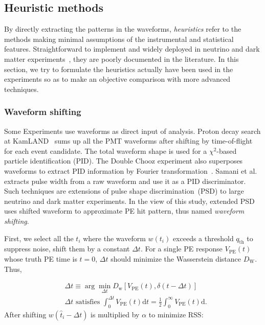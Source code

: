 \subsection{Heuristic methods}
By directly extracting the patterns in the waveforms, \textit{heuristics} refer to the methods making minimal assumptions of the instrumental and statistical features.  Straightforward to implement and widely deployed in neutrino and dark matter experiments~\cite{students22}, they are poorly documented in the literature.  In this section, we try to formulate the heuristics actually have been used in the experiments so as to make an objective comparison with more advanced techniques.

\subsubsection{Waveform shifting}
\label{sec:shifting}
Some Experiments use waveforms as direct input of analysis. Proton decay search at KamLAND~\cite{kamland_collaboration_search_2015} sums up all the PMT waveforms after shifting by time-of-flight for each event candidate.  The total waveform shape is used for a $\chi^2$-based particle identification (PID). The Double Chooz experiment also superposes waveforms to extract PID information by Fourier transformation~\cite{chooz_2018}. Samani et al.\cite{samani_pulse_2020} extracts pulse width from a raw waveform and use it as a PID discriminator.  Such techniques are extensions of pulse shape discrimination~(PSD) to large neutrino and dark matter experiments.  In the view of this study, extended PSD uses shifted waveform to approximate PE hit pattern, thus named \textit{waveform shifting}.

First, we select all the $t_i$ where the waveform $w(t_i)$ exceeds a threshold $q_\mathrm{th}$ to suppress noise, shift them by a constant $\Delta t$. For a single PE response $V_\mathrm{PE}(t)$ whose truth PE time is $t=0$, $\Delta t$ should minimize the Wasserstein distance $D_\mathrm{W}$. Thus,

\begin{equation}
  \begin{aligned}
    & \Delta t \equiv \arg\underset{\Delta t}{\min} D_\mathrm{w}\left[ V_\mathrm{PE}(t), \delta(t-\Delta t) \right] \\
    & \Delta t \text{ satisfies } \int_{0}^{\Delta t} V_\mathrm{PE}(t) \mathrm{d}t = \frac{1}{2} \int_{0}^{\infty} V_\mathrm{PE}(t) \mathrm{d}.
  \end{aligned}
  \label{eq:waveform-shift-dt}
\end{equation}
After shifting $w(\hat{t}_i - \Delta t)$ is multiplied by $\alpha$ to minimize RSS: 


